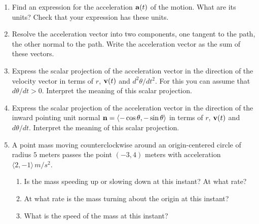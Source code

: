 \documentclass{ximera}
\begin{document}
\begin{question}
\begin{enumerate}
\item Find an expression for the acceleration ${\bf a}(t)$ of the motion. What are its units? Check that your expression has these units.

\item Resolve the acceleration vector into two components, one tangent to the path, the other normal to the path. Write the acceleration vector as the sum of these vectors.

\item Express the scalar projection of the acceleration vector in the direction of the velocity vector in terms of $r$, ${\bf v}(t)$ and $d^2\theta/dt^2$. For this you can assume that $d\theta / dt>0$. Interpret the meaning of this scalar projection.

\item Express the scalar projection of the acceleration vector in the direction of the inward pointing unit normal ${\bf n} = \langle -\cos\theta, -\sin\theta \rangle$ in terms of $r$, ${\bf v}(t)$ and $d\theta/dt$. Interpret the meaning of this scalar projection.

\item A point mass moving counterclockwise around an origin-centered circle of radius $5$ meters passes the point $(-3,4)$ meters with acceleration $\langle 2, -1\rangle \, m/s^2$.  

\begin{enumerate}
\item Is the mass speeding up or slowing down at this instant? At what rate?

\item At what rate is the mass turning about the origin at this instant?

\item What is the speed of the mass at this instant?
\end{enumerate}

\end{enumerate}

\end{question}
\end{document}
